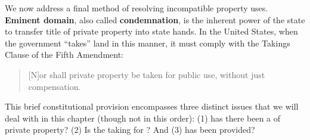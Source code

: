 We now address a final method of resolving incompatible property uses.
\textbf{Eminent domain}, also called \textbf{condemnation},
is the inherent power of the state to transfer title of
private property into state hands. In the United States, when the government
``takes'' land in this manner, it must comply with the Takings Clause of the
Fifth Amendment:
\begin{quote}
[N]or shall private property be taken for public use, without just compensation.
\end{quote}
This
brief constitutional provision encompasses three distinct issues that we will
deal with in this chapter (though not in this order): (1) has there been a
 of private property? (2) Is the taking for ? And
(3) has  been provided?

